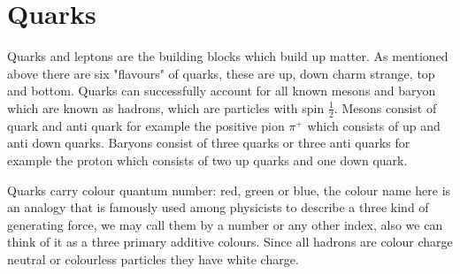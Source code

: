 \section{Quarks}
Quarks and leptons are the building blocks which build up matter. As mentioned above
there are six "flavours" of quarks, these are up, down charm strange, top and bottom.
Quarks can successfully account
for all known mesons and baryon which are known as hadrons, which are particles with spin $\frac{1}{2}$. Mesons consist
of quark and anti quark for example the positive pion $\pi^+$ which consists of up and anti down quarks. Baryons consist of three quarks or three anti quarks for example the proton which consists of two up quarks and one down quark.

Quarks carry colour quantum number: red, green or blue, the colour name here is an analogy  that is famously used among physicists to describe a three kind of generating force, we may call them by a number or any other index, also we can think of it as a three primary additive colours. Since all hadrons are colour charge neutral or colourless particles they have white charge. 

